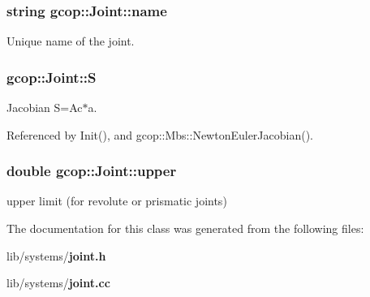 \subsubsection[{name}]{\setlength{\rightskip}{0pt plus 5cm}string {\bf gcop\-::\-Joint\-::name}}\label{classgcop_1_1Joint_a254242f36d463fce5f4cf6726d7e0eba}


\-Unique name of the joint. 

\subsubsection[{\-S}]{ {\bf gcop\-::\-Joint\-::\-S}}\label{classgcop_1_1Joint_a63ecd2d3a30145d64c2162f8d28fa519}


\-Jacobian \-S=\-Ac$\ast$a. 



\-Referenced by \-Init(), and gcop\-::\-Mbs\-::\-Newton\-Euler\-Jacobian().

\subsubsection[{upper}]{\setlength{\rightskip}{0pt plus 5cm}double {\bf gcop\-::\-Joint\-::upper}}\label{classgcop_1_1Joint_a28783c68c2aa56485259047a455df999}


upper limit (for revolute or prismatic joints) 



\-The documentation for this class was generated from the following files\-:\begin{DoxyCompactItemize}
\item 
lib/systems/{\bf joint.\-h}\item 
lib/systems/{\bf joint.\-cc}\end{DoxyCompactItemize}

